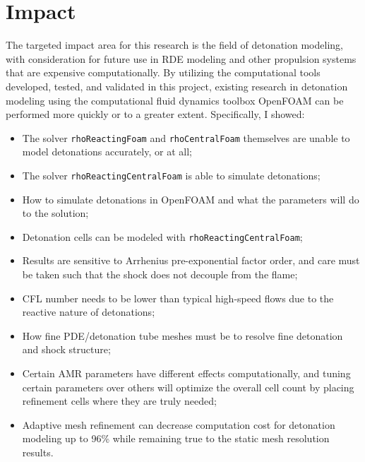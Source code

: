 \section{Impact}
The targeted impact area for this research is the field of detonation modeling, with consideration for future use in RDE modeling and other propulsion systems that are expensive computationally. By utilizing the computational tools developed, tested, and validated in this project, existing research in detonation modeling using the computational fluid dynamics toolbox OpenFOAM can be performed more quickly or to a greater extent. Specifically, I showed:
\begin{itemize}
\item The solver \verb|rhoReactingFoam| and \verb|rhoCentralFoam| themselves are unable to model detonations accurately, or at all;
\item The solver \verb|rhoReactingCentralFoam| is able to simulate detonations;
\item How to simulate detonations in OpenFOAM and what the parameters will do to the solution;
\item Detonation cells can be modeled with \texttt{rhoReactingCentralFoam};
\item Results are sensitive to Arrhenius pre-exponential factor order, and care must be taken such that the shock does not decouple from the flame;
\item CFL number needs to be lower than typical high-speed flows due to the reactive nature of detonations;
\item How fine PDE/detonation tube meshes must be to resolve fine detonation and shock structure;
\item Certain AMR parameters have different effects computationally, and tuning certain parameters over others will optimize the overall cell count by placing refinement cells where they are truly needed;
\item Adaptive mesh refinement can decrease computation cost for detonation modeling up to 96\% while remaining true to the static mesh resolution results. 
\end{itemize}

